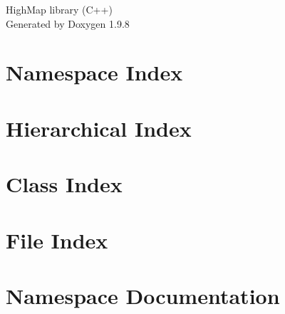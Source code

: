 \documentclass[twoside]{book}
\newcommand{\+}{\discretionary{\mbox{\scriptsize$\hookleftarrow$}}{}{}}
\newcommand{\clearemptydoublepage}{%
    \newpage{\pagestyle{empty}\cleardoublepage}%
  }
\begin{document}
  \raggedbottom
    \hypersetup{pageanchor=false,
                bookmarksnumbered=true,
                pdfencoding=unicode
               }
  \begin{titlepage}
  \vspace*{7cm}
  \begin{center}%
  {\Large High\+Map library (\+C++)}\\
  \vspace*{1cm}
  {\large Generated by Doxygen 1.9.8}\\
  \end{center}
  \end{titlepage}
  \clearemptydoublepage
  \tableofcontents
  \clearemptydoublepage
  \hypersetup{pageanchor=true}







\chapter{Namespace Index}

\chapter{Hierarchical Index}

\chapter{Class Index}

\chapter{File Index}

\chapter{Namespace Documentation}







\end{document}

